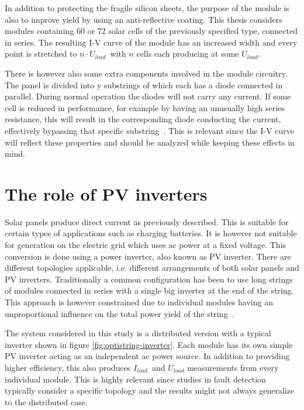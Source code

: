 
In addition to protecting the fragile silicon sheets, the purpose of the module is also to improve yield by using an anti-reflective coating.
This thesis considers modules containing 60 or 72 solar cells of the previously specified type, connected in series.
The resulting I-V curve of the module has an increased width and every point is stretched to $n \cdot U_{load}$ with $n$ cells each producing at some $U_{load}$.

There is however also some extra components involved in the module circuitry.
The panel is divided into y substrings of which each has a diode connected in parallel.
During normal operation the diodes will not carry any current.
If some cell is reduced in performance, for example by having an unusually high series resistance, this will result in the corresponding diode conducting the current, effectively bypassing that specific substring~\cite{Roman2006}.
This is relevant since the I-V curve will reflect these properties and should be analyzed while keeping these effects in mind.

\section{The role of PV inverters}
Solar panels produce direct current as previously described.
This is suitable for certain types of applications such as charging batteries.
It is however not suitable for generation on the electric grid which uses ac power at a fixed voltage.
This conversion is done using a power inverter, also known as PV inverter.
There are different topologies applicable, i.e. different arrangements of both solar panels and PV inverters.
Traditionally a common configuration has been to use long strings of modules connected in series with a single big inverter at the end of the string.
This approach is however constrained due to individual modules having an unproportional influence on the total power yield of the string~\cite{Roman2006}.


The system considered in this study is a distributed version with a typical inverter shown in figure \ref{fig:optistring-inverter}.
Each module has its own simple PV inverter acting as an independent ac power source.
In addition to providing higher efficiency, this also produces $I_{load}$ and $U_{load}$ measurements from every individual module.
This is highly relevant since studies in fault detection typically consider a specific topology and the results might not always generalize to the distributed case.

